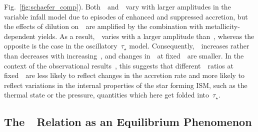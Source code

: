 \documentclass[ms.tex]{subfiles}
\begin{document}
Fig.~\ref{fig:schaefer_comp}).
Both~\oh~and~\nh~vary with larger amplitudes in the variable infall model due to
episodes of enhanced and suppressed accretion, but the effects of dilution
on~\nh~are amplified by the combination with metallicity-dependent yields.
As a result,~\nh~varies with a larger amplitude than~\oh, whereas the opposite
is the case in the oscillatory~$\tau_\star$ model.
Consequently,~\no~increases rather than decreases with increasing~\oh, and
changes in~\no~at fixed~\oh~are smaller.
In the context of the observational results~\citep{Schaefer2020}, this suggests
that different~\no~ratios at fixed~\oh~are less likely to reflect changes in
the accretion rate and more likely to reflect variations in the internal
properties of the star forming ISM, such as the thermal state or the pressure,
quantities which here get folded into~$\tau_\star$.

\subsection{The~\ohno~Relation as an Equilibrium Phenomenon}
\label{sec:results:ohno_equilibrium}
\end{document}
